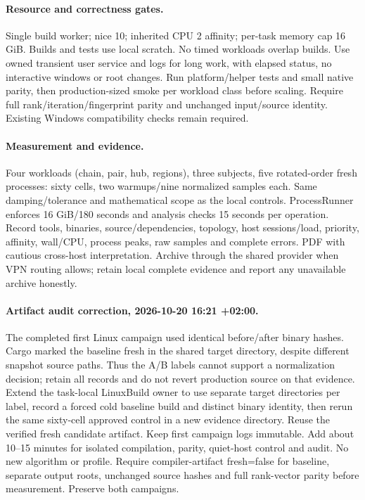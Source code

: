 \documentclass[11pt,a4paper]{article}
\begin{document}
\paragraph{Resource and correctness gates.} Single build worker; nice 10; inherited
CPU 2 affinity; per-task memory cap 16 GiB. Builds and tests use local scratch.
No timed workloads overlap builds. Use owned transient user service and logs for
long work, with elapsed status, no interactive windows or root changes.
Run platform/helper tests and small native parity, then production-sized smoke per
workload class before scaling. Require full rank/iteration/fingerprint parity and
unchanged input/source identity. Existing Windows compatibility checks remain required.
\paragraph{Measurement and evidence.} Four workloads (chain, pair, hub, regions), three
subjects, five rotated-order fresh processes: sixty cells, two warmups/nine normalized
samples each. Same damping/tolerance and mathematical scope as the local controls.
ProcessRunner enforces 16 GiB/180 seconds and analysis checks 15 seconds per operation.
Record tools, binaries, source/dependencies, topology, host sessions/load, priority,
affinity, wall/CPU, process peaks, raw samples and complete errors. PDF with cautious
cross-host interpretation. Archive through the shared provider when VPN routing allows;
retain local complete evidence and report any unavailable archive honestly.
\paragraph{Artifact audit correction, 2026-10-20 16:21 +02:00.}
The completed first Linux campaign used identical before/after binary hashes.
Cargo marked the baseline fresh in the shared target directory, despite different
snapshot source paths. Thus the A/B labels cannot support a normalization decision;
retain all records and do not revert production source on that evidence.
Extend the task-local LinuxBuild owner to use separate target directories per label,
record a forced cold baseline build and distinct binary identity, then rerun the same
sixty-cell approved control in a new evidence directory. Reuse the verified fresh
candidate artifact. Keep first campaign logs immutable. Add about 10--15 minutes for
isolated compilation, parity, quiet-host control and audit. No new algorithm or profile.
Require compiler-artifact fresh=false for baseline, separate output roots, unchanged
source hashes and full rank-vector parity before measurement. Preserve both campaigns.
\end{document}
